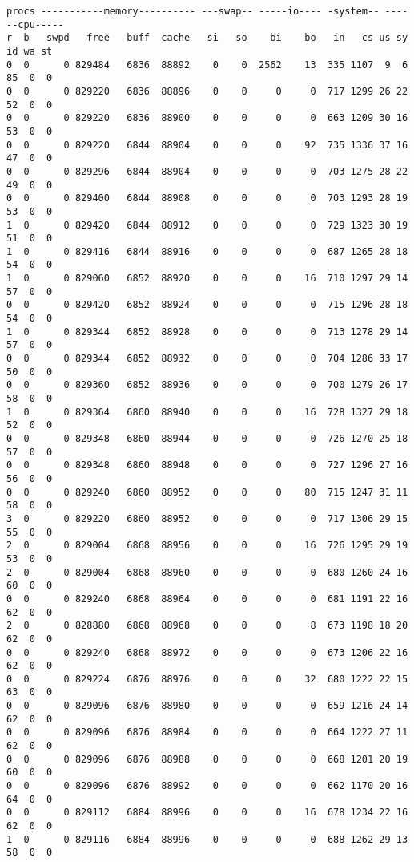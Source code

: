 \begin{lstlisting}[caption={Eerste 50 resultaten}, basicstyle=\footnotesize]
procs -----------memory---------- ---swap-- -----io---- -system-- ------cpu-----
r  b   swpd   free   buff  cache   si   so    bi    bo   in   cs us sy id wa st
0  0      0 829484   6836  88892    0    0  2562    13  335 1107  9  6 85  0  0
0  0      0 829220   6836  88896    0    0     0     0  717 1299 26 22 52  0  0
0  0      0 829220   6836  88900    0    0     0     0  663 1209 30 16 53  0  0
0  0      0 829220   6844  88904    0    0     0    92  735 1336 37 16 47  0  0
0  0      0 829296   6844  88904    0    0     0     0  703 1275 28 22 49  0  0
0  0      0 829400   6844  88908    0    0     0     0  703 1293 28 19 53  0  0
1  0      0 829420   6844  88912    0    0     0     0  729 1323 30 19 51  0  0
1  0      0 829416   6844  88916    0    0     0     0  687 1265 28 18 54  0  0
1  0      0 829060   6852  88920    0    0     0    16  710 1297 29 14 57  0  0
0  0      0 829420   6852  88924    0    0     0     0  715 1296 28 18 54  0  0
1  0      0 829344   6852  88928    0    0     0     0  713 1278 29 14 57  0  0
0  0      0 829344   6852  88932    0    0     0     0  704 1286 33 17 50  0  0
0  0      0 829360   6852  88936    0    0     0     0  700 1279 26 17 58  0  0
1  0      0 829364   6860  88940    0    0     0    16  728 1327 29 18 52  0  0
0  0      0 829348   6860  88944    0    0     0     0  726 1270 25 18 57  0  0
0  0      0 829348   6860  88948    0    0     0     0  727 1296 27 16 56  0  0
0  0      0 829240   6860  88952    0    0     0    80  715 1247 31 11 58  0  0
3  0      0 829220   6860  88952    0    0     0     0  717 1306 29 15 55  0  0
2  0      0 829004   6868  88956    0    0     0    16  726 1295 29 19 53  0  0
2  0      0 829004   6868  88960    0    0     0     0  680 1260 24 16 60  0  0
0  0      0 829240   6868  88964    0    0     0     0  681 1191 22 16 62  0  0
2  0      0 828880   6868  88968    0    0     0     8  673 1198 18 20 62  0  0
0  0      0 829240   6868  88972    0    0     0     0  673 1206 22 16 62  0  0
0  0      0 829224   6876  88976    0    0     0    32  680 1222 22 15 63  0  0
0  0      0 829096   6876  88980    0    0     0     0  659 1216 24 14 62  0  0
0  0      0 829096   6876  88984    0    0     0     0  664 1222 27 11 62  0  0
0  0      0 829096   6876  88988    0    0     0     0  668 1201 20 19 60  0  0
0  0      0 829096   6876  88992    0    0     0     0  662 1170 20 16 64  0  0
0  0      0 829112   6884  88996    0    0     0    16  678 1234 22 16 62  0  0
1  0      0 829116   6884  88996    0    0     0     0  688 1262 29 13 58  0  0

\end{lstlisting}
